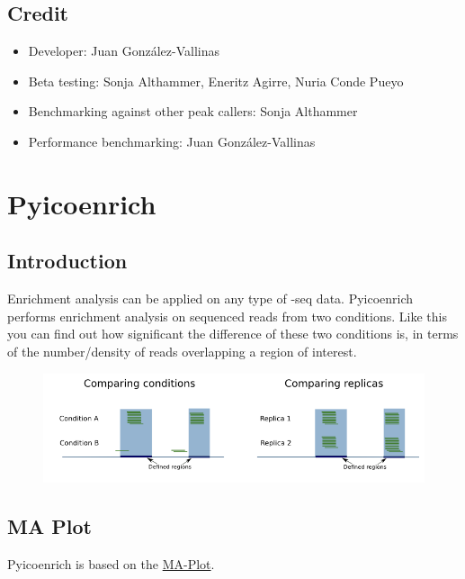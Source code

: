 \documentclass[letterpaper,10pt,english]{sphinxmanual}
\begin{document}
\subsection{Credit}
\label{pyicoller:credit}\begin{itemize}
\item {} 
Developer: Juan González-Vallinas

\item {} 
Beta testing: Sonja Althammer, Eneritz Agirre, Nuria Conde Pueyo

\item {} 
Benchmarking against other peak callers: Sonja Althammer

\item {} 
Performance benchmarking: Juan González-Vallinas

\end{itemize}


\section{Pyicoenrich}
\label{pyicoenrich:pyicoenrich}\label{pyicoenrich::doc}

\subsection{Introduction}
\label{pyicoenrich:introduction}
Enrichment analysis can be applied on any type of -seq data. Pyicoenrich performs enrichment analysis on sequenced reads from two conditions. Like this you can find out how significant the difference of these two conditions is, in terms of the number/density of reads overlapping a region of interest.
\begin{figure}[htbp]
\centering

\includegraphics{enrichment.png}
\end{figure}


\subsection{MA Plot}
\label{pyicoenrich:ma-plot}
Pyicoenrich is based on the \href{http://en.wikipedia.org/wiki/MA\_plot}{MA-Plot}.
\end{document}
